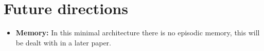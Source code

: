 \documentclass[orivec]{llncs}
\newcommand{\vect}[1]{\boldsymbol{#1}}
\begin{document}
\section{Future directions}

\begin{itemize}

\item \textbf{Memory:}  In this minimal architecture there is no episodic memory, this will be dealt with in a later paper. %
\end{itemize}
\end{document}
